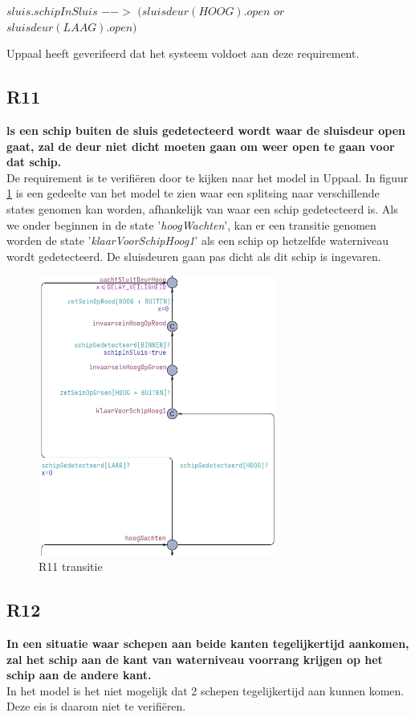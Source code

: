 \documentclass{article} %
\begin{document}
\begin{boxA}
    $sluis.schipInSluis$ $-->$ $(sluisdeur(HOOG).open$ $or$ $sluisdeur(LAAG).open)$
\end{boxA}

Uppaal heeft geverifeerd dat het systeem voldoet aan deze requirement.


\subsection{R11}
\textbf{ls een schip buiten de sluis gedetecteerd wordt waar de sluisdeur open gaat, zal de deur niet dicht moeten gaan om weer open te gaan voor dat schip.} \\
De requirement is te verifiëren door te kijken naar het model in Uppaal. In figuur \ref{r11} is een gedeelte van het model te zien waar een splitsing naar verschillende states genomen kan worden, afhankelijk van waar een schip gedetecteerd is. Als we onder beginnen in de state '\textit{hoogWachten}', kan er een transitie genomen worden de state '\textit{klaarVoorSchipHoog1}' als een schip op hetzelfde waterniveau wordt gedetecteerd. De sluisdeuren gaan pas dicht als dit schip is ingevaren. \par
\begin{figure}[h]
    \centering
    \includegraphics[width=0.7\textwidth]{R11.png}
    \caption{R11 transitie}
    \label{r11}
\end{figure}
\newpage

\subsection{R12}
\textbf{In een situatie waar schepen aan beide kanten tegelijkertijd
aankomen, zal het schip aan de kant van waterniveau voorrang krijgen
op het schip aan de andere kant.} \\
In het model is het niet mogelijk dat 2 schepen tegelijkertijd aan kunnen komen. Deze eis is daarom niet te verifiëren. \par
\end{document}

